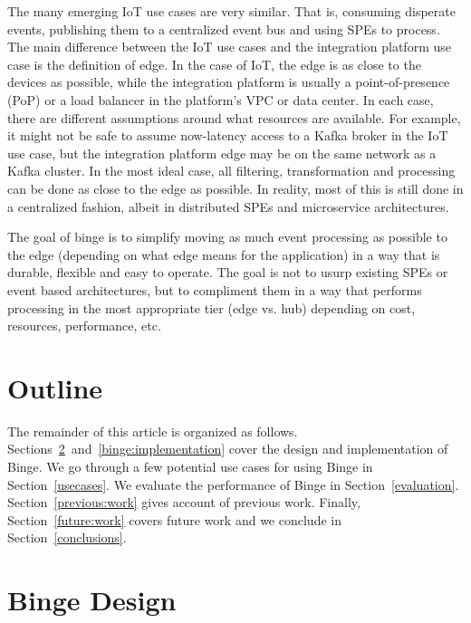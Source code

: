 \documentclass[10pt,twocolumn]{article}
\begin{document}
The many emerging IoT use cases are very similar.  That is, consuming disperate
events, publishing them to a centralized event bus and using SPEs to process.
The main difference between the IoT use cases and the integration platform use
case is the definition of edge.  In the case of IoT, the edge is as close to
the devices as possible, while the integration platform is usually a
point-of-presence (PoP) or a load balancer in the platform's VPC or data
center.   In each case, there are different assumptions around what resources
are available.  For example, it might not be safe to assume now-latency access
to a Kafka broker in the IoT use case, but the integration platform edge may be
on the same network as a Kafka cluster.  In the most ideal case, all filtering,
transformation and processing can be done as close to the edge as possible.  In
reality, most of this is still done in a centralized fashion, albeit in
distributed SPEs and microservice architectures.

The goal of binge is to simplify moving as much event processing as possible to
the edge (depending on what edge means for the application) in a way that is
durable, flexible and easy to operate.  The goal is not to usurp existing SPEs
or event based architectures, but to compliment them in a way that performs
processing in the most appropriate tier (edge vs. hub) depending on cost,
resources, performance, etc.

\section{Outline}
The remainder of this article is organized as follows.
Sections~\ref{binge:design}~and~\ref{binge:implementation} cover the design and
implementation of Binge.  We go through a few potential use cases for using
Binge in Section~\ref{usecases}.  We evaluate the performance of Binge in
Section~\ref{evaluation}.  Section~\ref{previous:work} gives account of
previous work.  Finally, Section~\ref{future:work} covers future work and we
conclude in Section~\ref{conclusions}.

\section{Binge Design}\label{binge:design}
\end{document}
